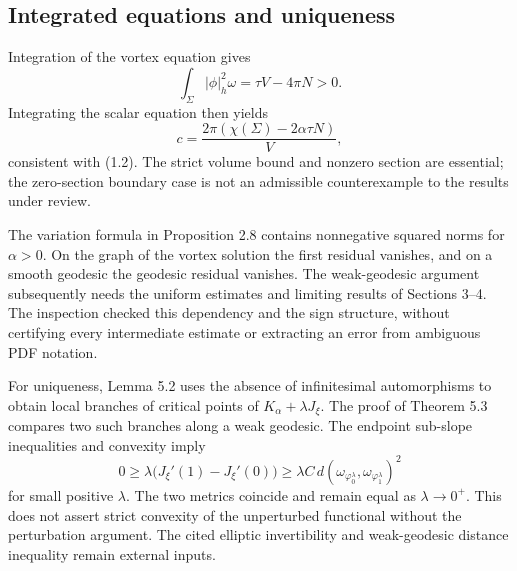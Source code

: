 \documentclass[10pt]{article}
\begin{document}
\subsection*{Integrated equations and uniqueness}
Integration of the vortex equation gives \[\int_\Sigma |\phi|_h^2\omega=\tau V-4\pi N>0.\] Integrating the scalar equation then yields \[c=\frac{2\pi(\chi(\Sigma)-2\alpha\tau N)}{V},\] consistent with (1.2). The strict volume bound and nonzero section are essential; the zero-section boundary case is not an admissible counterexample to the results under review.\par
The variation formula in Proposition 2.8 contains nonnegative squared norms for \(\alpha>0\). On the graph of the vortex solution the first residual vanishes, and on a smooth geodesic the geodesic residual vanishes. The weak-geodesic argument subsequently needs the uniform estimates and limiting results of Sections 3–4. The inspection checked this dependency and the sign structure, without certifying every intermediate estimate or extracting an error from ambiguous PDF notation.\par
For uniqueness, Lemma 5.2 uses the absence of infinitesimal automorphisms to obtain local branches of critical points of \(K_\alpha+\lambda J_\xi\). The proof of Theorem 5.3 compares two such branches along a weak geodesic. The endpoint sub-slope inequalities and convexity imply \[0\geq \lambda\bigl(J_\xi'(1)-J_\xi'(0)\bigr)
   \geq \lambda C\,d(\omega_{\varphi_0^\lambda},
                     \omega_{\varphi_1^\lambda})^2\] for small positive \(\lambda\). The two metrics coincide and remain equal as \(\lambda\to0^+\). This does not assert strict convexity of the unperturbed functional without the perturbation argument. The cited elliptic invertibility and weak-geodesic distance inequality remain external inputs.\par
\end{document}
